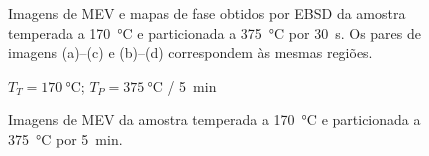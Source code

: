 \begin{figure}
  \caption{Imagens de MEV e mapas de fase obtidos por EBSD da amostra temperada a \SI{170}{\degreeCelsius} e particionada a \SI{375}{\degreeCelsius} por 30~s. Os pares de imagens (a)--(c) e (b)--(d) correspondem às mesmas regiões.}
  \label{fig:TP375-30s_MEV}
\end{figure}

\begin{figure}
  \centering
  $T_T = \SI{170}{\degreeCelsius}$; $T_P = \SI{375}{\degreeCelsius}$ / \SI{5}{min}\\
  \quad
  \caption{Imagens de MEV da amostra temperada a \SI{170}{\degreeCelsius} e particionada a \SI{375}{\degreeCelsius} por 5~min.}
  \label{fig:TP375-5min_MEV}
\end{figure}

